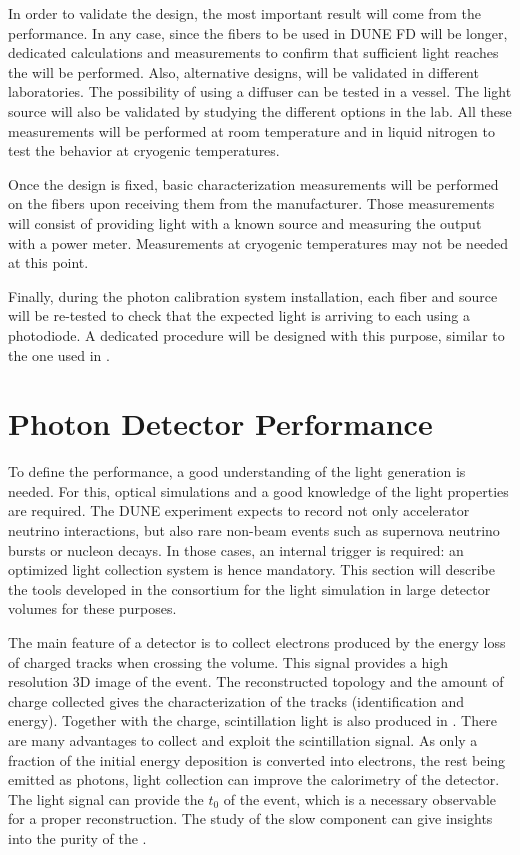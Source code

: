 In order to validate the design, the most important result will come from the  performance. In any case, since the fibers to be used in DUNE FD will be longer, dedicated calculations and measurements to confirm that sufficient light reaches the  will be performed. Also, alternative designs, will be validated in different laboratories. The possibility of using a diffuser can be tested in a vessel. The light source will also be validated by studying the different options in the lab. All these measurements will be performed at room temperature and in liquid nitrogen to test the behavior at cryogenic temperatures.

Once the design is fixed, basic characterization measurements will be performed on the fibers upon receiving them from the manufacturer. Those measurements will consist of providing light with a known source and measuring the output with a power meter. Measurements at cryogenic temperatures may not be needed at this point.

Finally, during the photon calibration system installation, each fiber and source will be re-tested to check that the expected light is arriving to each  using a photodiode. A dedicated procedure will be designed with this purpose, similar to the one used in .

\section{Photon Detector Performance}
\label{sec:fddp-pd-6}

To define the  performance, a good understanding of the light generation is needed. For this, optical simulations and a good knowledge of the light properties are required. The DUNE experiment expects to record not only accelerator neutrino interactions, but also rare non-beam events such as supernova neutrino bursts or nucleon decays. In those cases, an internal trigger is required: an optimized light collection system is hence mandatory. This section will describe the tools developed in the consortium for the light simulation in large detector volumes for these purposes.

The main feature of a \lartpc detector is to collect electrons produced by the energy loss of charged tracks when crossing the volume. This signal provides a high resolution 3D image of the event. The reconstructed topology and the amount of charge collected gives the characterization of the tracks (identification and energy). Together with the charge, scintillation light is also produced in \lar. There are many advantages to collect and exploit the scintillation signal. As only a fraction of the initial energy deposition is converted into electrons, the rest being emitted as photons, light collection can improve the calorimetry of the detector. The light signal can provide the $t_0$ of the event, which is a necessary observable for a proper reconstruction. The study of the slow component can give insights into the purity of the \lar. 

